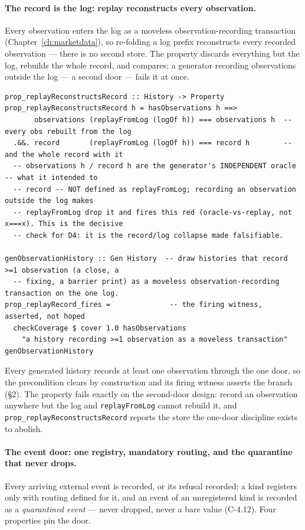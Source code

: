\documentclass[11pt,a4paper]{article}
\begin{document}
\paragraph{The record is the log: replay reconstructs every observation.}
Every observation enters the log as a moveless observation-recording transaction
(Chapter~\ref{ch:marketdata}), so re-folding a log prefix reconstructs every recorded
observation --- there is no second store. The property discards everything but the log,
rebuilds the whole record, and compares; a generator recording observations outside the log
--- a second door --- fails it at once.

\begin{lstlisting}
prop_replayReconstructsRecord :: History -> Property
prop_replayReconstructsRecord h = hasObservations h ==>
       observations (replayFromLog (logOf h)) === observations h  -- every obs rebuilt from the log
  .&&. record       (replayFromLog (logOf h)) === record h        -- and the whole record with it
  -- observations h / record h are the generator's INDEPENDENT oracle -- what it intended to
  -- record -- NOT defined as replayFromLog; recording an observation outside the log makes
  -- replayFromLog drop it and fires this red (oracle-vs-replay, not x===x). This is the decisive
  -- check for D4: it is the record/log collapse made falsifiable.

genObservationHistory :: Gen History  -- draw histories that record >=1 observation (a close, a
  -- fixing, a barrier print) as a moveless observation-recording transaction on the one log.
prop_replayRecord_fires =              -- the firing witness, asserted, not hoped
  checkCoverage $ cover 1.0 hasObservations
    "a history recording >=1 observation as a moveless transaction" genObservationHistory
\end{lstlisting}

Every generated history records at least one observation through the one door, so the precondition
clears by construction and its firing witness asserts the branch (\S 2). The property fails exactly
on the second-door design: record an observation
anywhere but the log and \texttt{replayFromLog} cannot rebuild it, and
\texttt{prop\_replayReconstructsRecord} reports the store the one-door discipline exists to abolish.

\paragraph{The event door: one registry, mandatory routing, and the quarantine that never drops.}
Every arriving external event is recorded, or its refusal recorded; a kind registers only with
routing defined for it, and an event of an unregistered kind is recorded as a \emph{quarantined
event} --- never dropped, never a bare value (C-4.12). Four properties pin the door.
\end{document}
